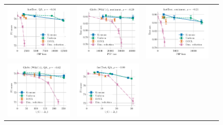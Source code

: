 \begin{figure}
\begin{tabular}{@{\hskip -0.0in}c@{\hskip -0.0in}c@{\hskip -0.0in}c@{\hskip -0.0in}c@{\hskip -0.0in}}
		\includegraphics[width=.245\linewidth]{figures/fasttext1m_qa_best-f1_vs_gram-large-dim-frob-error_linx_det.pdf} &
		\includegraphics[width=.245\linewidth]{figures/glove400k_sentiment_sst_test-acc_vs_gram-large-dim-frob-error_linx_det.pdf} &
		\includegraphics[width=.245\linewidth]{figures/fasttext1m_sentiment_sst_test-acc_vs_gram-large-dim-frob-error_linx_det.pdf} \\
		\includegraphics[width=.245\linewidth]{figures/glove400k_qa_best-f1_vs_gram-large-dim-delta1-2-trans_linx_det.pdf} &
		\includegraphics[width=.245\linewidth]{figures/fasttext1m_qa_best-f1_vs_gram-large-dim-delta1-2-trans_linx_det.pdf} &

\end{tabular}
\end{figure}
